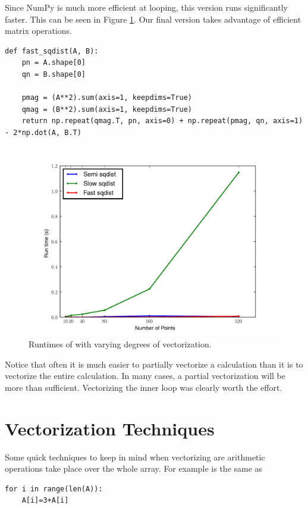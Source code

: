 Since NumPy is much more efficient at looping, this version runs significantly faster.  This can be seen in Figure \ref{fig:sqplot}.
Our final version takes advantage of efficient matrix operations.
\begin{lstlisting}
def fast_sqdist(A, B):
    pn = A.shape[0]
    qn = B.shape[0]

    pmag = (A**2).sum(axis=1, keepdims=True)
    qmag = (B**2).sum(axis=1, keepdims=True)
    return np.repeat(qmag.T, pn, axis=0) + np.repeat(pmag, qn, axis=1) - 2*np.dot(A, B.T)
\end{lstlisting}

\begin{figure}[h]
\centering
\includegraphics[width=\textwidth]{sqplot.pdf}
\caption{Runtimes of  with varying degrees of vectorization.}
\label{fig:sqplot}
\end{figure}

Notice that often it is much easier to partially vectorize a calculation than it is to vectorize the entire calculation.
In many cases, a partial vectorization will be more than sufficient.  Vectorizing the inner loop was clearly worth the effort.

\section*{Vectorization Techniques}
Some quick techniques to keep in mind when vectorizing are arithmetic operations take place over the whole array. For example  is the same as 
\begin{lstlisting}
for i in range(len(A)):
	A[i]=3+A[i]
\end{lstlisting}

